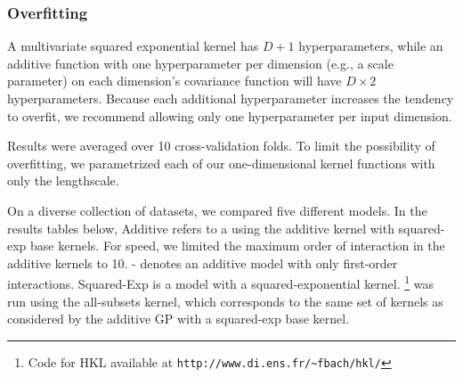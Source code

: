 \subsubsection{Overfitting}
A multivariate squared exponential kernel has $D + 1$ hyperparameters, while an additive function with one hyperparameter per dimension (e.g., a scale parameter) on each dimension's covariance function will have $D \times 2$ hyperparameters.  Because each additional hyperparameter increases the tendency to overfit, we recommend allowing only one hyperparameter per input dimension. 

%
%
Results were averaged over 10 cross-validation folds.
To limit the possibility of overfitting, we parametrized each of our one-dimensional kernel functions with only the lengthscale.  


On a diverse collection of datasets, we compared five different models.
In the results tables below, \gp{} Additive refers to a \gp{} using the additive kernel with squared-exp base kernels.
For speed, we limited the maximum order of interaction in the additive kernels to 10.  \gp{}-\GAM{} denotes an additive \gp{} model with only first-order interactions.  \gp{} Squared-Exp is a \gp{} model with a squared-exponential \ARD{} kernel.  \HKL{}\footnote{Code for HKL available at \texttt{http://www.di.ens.fr/\textasciitilde fbach/hkl/}}
was run using the all-subsets kernel, which corresponds to the same set of kernels as considered by the additive GP with a squared-exp base kernel.     

